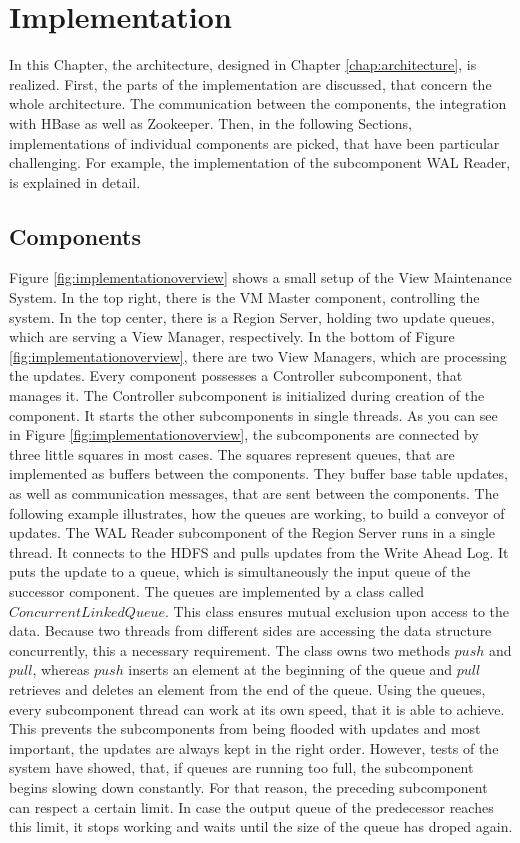 \documentclass[11pt,a4paper,bibtotoc,idxtotoc,headsepline,footsepline,footexclude,BCOR12mm,DIV13]{scrbook}
\begin{document}
\chapter{Implementation}
\label{chap:implementation}

In this Chapter, the architecture, designed in Chapter \ref{chap:architecture}, is realized. First, the parts of the implementation are discussed, that concern the whole architecture.  The communication between the components, the integration with HBase as well as Zookeeper. Then, in the following Sections, implementations of individual components are picked, that have been particular challenging. For example, the implementation of the subcomponent WAL Reader, is explained in detail. 

\section{Components}

Figure \ref{fig:implementationoverview} shows a small setup of the View Maintenance System. In the top right, there is the VM Master component, controlling the system. In the top center, there is a Region Server, holding two update queues, which are serving a View Manager, respectively. In the bottom of Figure \ref{fig:implementationoverview}, there are two View Managers, which are processing the updates. Every component possesses a Controller subcomponent, that manages it. The Controller subcomponent is initialized during creation of the component. It starts the other subcomponents in single threads. As you can see in Figure \ref{fig:implementationoverview}, the subcomponents are connected by three little squares in most cases. The squares represent queues, that are implemented as buffers between the components. They buffer base table updates, as well as communication messages, that are sent between the components. The following example illustrates, how the queues are working, to build a conveyor of updates. The WAL Reader subcomponent of the Region Server runs in a single thread. It connects to the HDFS and pulls updates from the Write Ahead Log. It puts the update to a queue, which is simultaneously the input queue of the successor component. The queues are implemented by a class called $ConcurrentLinkedQueue$. This class ensures mutual exclusion upon access to the data. Because two threads from different sides are accessing the data structure concurrently, this a necessary requirement. The class owns two methods $push$ and $pull$, whereas $push$ inserts an element at the beginning of the queue and $pull$ retrieves and deletes an element from the end of the queue. Using the queues, every subcomponent thread can work at its own speed, that it is able to achieve. This prevents the subcomponents from being flooded with updates and most important, the updates are always kept in the right order. However, tests of the system have showed, that, if queues are running too full, the subcomponent begins slowing down constantly. For that reason, the preceding subcomponent can respect a certain limit. In case the output queue of the predecessor reaches this limit, it stops working and waits until the size of the queue has droped again.
\end{document}
